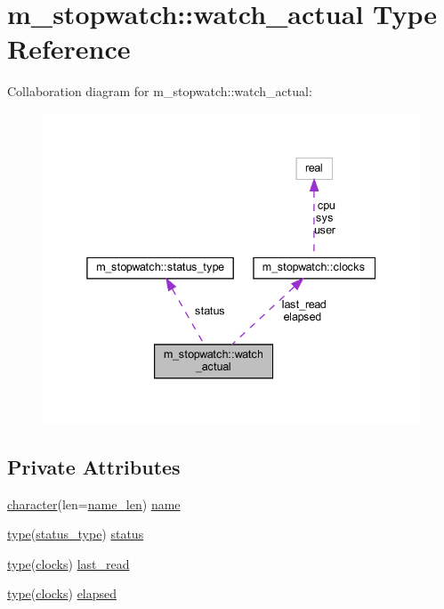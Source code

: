 \hypertarget{structm__stopwatch_1_1watch__actual}{}\section{m\+\_\+stopwatch\+:\+:watch\+\_\+actual Type Reference}
\label{structm__stopwatch_1_1watch__actual}


Collaboration diagram for m\+\_\+stopwatch\+:\+:watch\+\_\+actual\+:
\nopagebreak
\begin{figure}[H]
\begin{center}
\leavevmode
\includegraphics[width=338pt]{structm__stopwatch_1_1watch__actual__coll__graph}
\end{center}
\end{figure}
\subsection*{Private Attributes}
\begin{DoxyCompactItemize}
\item 
\hyperlink{option__stopwatch_83_8txt_abd4b21fbbd175834027b5224bfe97e66}{character}(len=\hyperlink{namespacem__stopwatch_a90c3eba08ec94bd1499d3afcd621d045}{name\+\_\+len}) \hyperlink{structm__stopwatch_1_1watch__actual_a991c67cbbf530fe7690d0e20d82acd83}{name}
\item 
\hyperlink{stop__watch_83_8txt_a70f0ead91c32e25323c03265aa302c1c}{type}(\hyperlink{structm__stopwatch_1_1status__type}{status\+\_\+type}) \hyperlink{structm__stopwatch_1_1watch__actual_aa5946ce38edc266e09dfc0a12a33710c}{status}
\item 
\hyperlink{stop__watch_83_8txt_a70f0ead91c32e25323c03265aa302c1c}{type}(\hyperlink{structm__stopwatch_1_1clocks}{clocks}) \hyperlink{structm__stopwatch_1_1watch__actual_ae1d38c1b64f646e6342283c24ad3eaad}{last\+\_\+read}
\item 
\hyperlink{stop__watch_83_8txt_a70f0ead91c32e25323c03265aa302c1c}{type}(\hyperlink{structm__stopwatch_1_1clocks}{clocks}) \hyperlink{structm__stopwatch_1_1watch__actual_a092bd61ab45253b2851f5999f44e6a72}{elapsed}
\end{DoxyCompactItemize}


